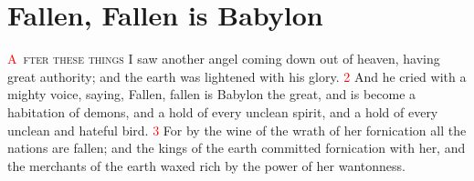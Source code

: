 \documentclass[12pt,twoside]{memoir}
\newcommand{\vnum}[1]{\textcolor{red}{\normalsize{#1}}}
\begin{document}

\chapter{Fallen, Fallen is Babylon}
\lettrine[lines=3,slope=-0.5em]{\textcolor{red}{A}}{\ fter these things} I saw another angel coming down out of heaven, having great authority; and the earth was lightened with his glory. 
\vnum{2} And he cried with a mighty voice, saying, Fallen, fallen is Babylon the great, and is become a habitation of demons, and a hold of every unclean spirit, and a hold of every unclean and hateful bird. 
\vnum{3} For by the wine of the wrath of her fornication all the nations are fallen; and the kings of the earth committed fornication with her, and the merchants of the earth waxed rich by the power of her wantonness.
\end{document}
